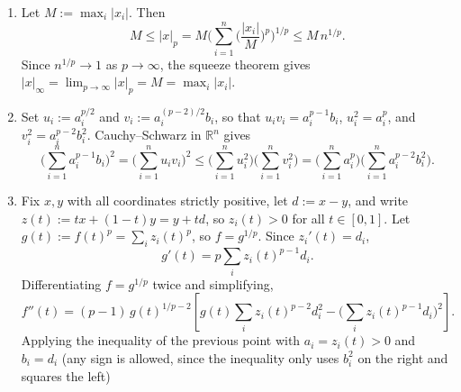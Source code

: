 \begin{exercisesolution}
\begin{enumerate}[label=\textbf{(\alph*)}]
\begin{center}
    \end{center}
  \item Let $M := \max_i |x_i|$. Then
    \[
    M \leq |x|_p = M\Big(\sum_{i=1}^{n}\Big(\frac{|x_i|}{M}\Big)^p\Big)^{1/p} \leq M\,n^{1/p}.
    \]
    Since $n^{1/p} \to 1$ as $p \to \infty$, the squeeze theorem gives $|x|_\infty = \lim_{p\to\infty}|x|_p = M = \max_i |x_i|$.
  \item Set $u_i := a_i^{p/2}$ and $v_i := a_i^{(p-2)/2}b_i$, so that $u_iv_i = a_i^{p-1}b_i$,
    $u_i^2 = a_i^p$, and $v_i^2 = a_i^{p-2}b_i^2$. Cauchy--Schwarz in $\mathbb{R}^n$ gives
    \[
    \Big(\sum_{i=1}^n a_i^{p-1}b_i\Big)^2 = \Big(\sum_{i=1}^n u_iv_i\Big)^2 \leq \Big(\sum_{i=1}^n u_i^2\Big)\Big(\sum_{i=1}^n v_i^2\Big) = \Big(\sum_{i=1}^n a_i^p\Big)\Big(\sum_{i=1}^n a_i^{p-2}b_i^2\Big).
    \]
  \item Fix $x, y$ with all coordinates strictly positive, let $d := x - y$, and write
    $z(t) := tx+(1-t)y = y + td$, so $z_i(t) > 0$ for all $t \in [0,1]$. Let $g(t) := f(t)^p =
    \sum_i z_i(t)^p$, so $f = g^{1/p}$. Since $z_i'(t) = d_i$,
    \[
    g'(t) = p\sum_i z_i(t)^{p-1}d_i.
    \]
    Differentiating $f = g^{1/p}$ twice and simplifying,
    \[
    f''(t) = (p-1)\,g(t)^{1/p-2}\left[g(t)\sum_i z_i(t)^{p-2}d_i^2 - \Big(\sum_i z_i(t)^{p-1}d_i\Big)^2\right].
    \]
    Applying the inequality of the previous point with $a_i = z_i(t) > 0$ and $b_i = d_i$ (any
    sign is allowed, since the inequality only uses $b_i^2$ on the right and squares the left)

\end{enumerate}
\end{exercisesolution}
